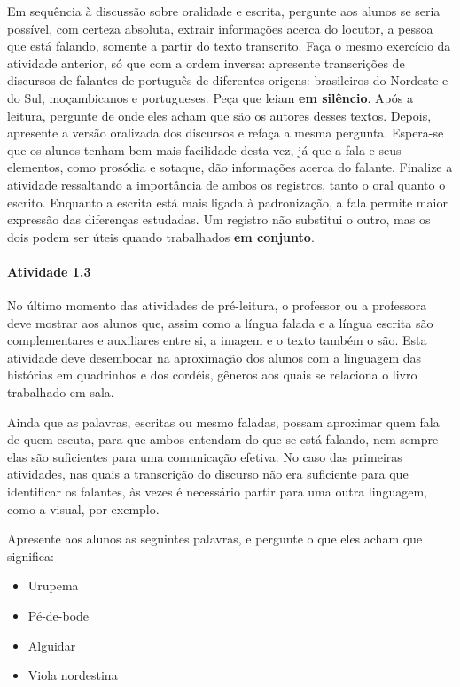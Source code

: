 \documentclass[11pt]{extarticle}
\begin{document}
Em sequência à discussão sobre oralidade e escrita, pergunte aos alunos se seria possível,
com certeza absoluta, extrair informações acerca do locutor, a pessoa que está falando, 
somente a partir do texto transcrito. Faça o mesmo exercício da atividade anterior, 
só que com a ordem inversa: apresente transcrições de discursos de falantes de português de diferentes
origens: brasileiros do Nordeste e do Sul, moçambicanos e portugueses. Peça que leiam \textbf{em silêncio}. 
Após a leitura, pergunte de onde eles acham que são os autores desses textos. 
Depois, apresente a versão oralizada dos discursos e refaça a mesma pergunta. 
Espera-se que os alunos tenham bem mais facilidade desta vez, já que a fala e seus elementos, 
como prosódia e sotaque, dão informações acerca do falante. 
Finalize a atividade ressaltando a importância de ambos os registros, tanto o oral quanto o escrito.
Enquanto a escrita está mais ligada à padronização, a fala permite maior expressão das diferenças estudadas. 
Um registro não substitui o outro, mas os dois podem ser úteis quando trabalhados \textbf{em conjunto}.


\paragraph{Atividade 1.3}

No último momento das atividades de pré-leitura, o professor ou a professora deve 
mostrar aos alunos que, assim como a língua falada e a língua escrita são complementares
e auxiliares entre si, a imagem e o texto também o são. Esta atividade deve desembocar 
na aproximação dos alunos com a linguagem das histórias em quadrinhos e dos cordéis,
gêneros aos quais se relaciona o livro trabalhado em sala. 

Ainda que as palavras, escritas ou mesmo faladas, possam aproximar quem fala de quem escuta,
para que ambos entendam do que se está falando, nem sempre elas são suficientes para uma comunicação efetiva.
No caso das primeiras atividades, nas quais a transcrição do discurso não era suficiente para que
identificar os falantes, às vezes é necessário partir para uma 
outra linguagem, como a visual, por exemplo. 

Apresente aos alunos as seguintes palavras, e pergunte o que eles acham que significa:

\begin{itemize}
\item Urupema
\item Pé-de-bode
\item Alguidar
\item Viola nordestina
\end{itemize}
\end{document}
